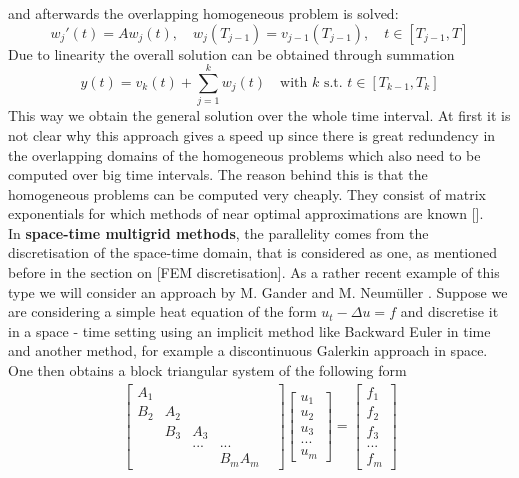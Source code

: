 \documentclass[../draft_1.tex]{subfiles}
\begin{document}
and afterwards the overlapping homogeneous problem is solved:
\begin{equation}
w_j'(t) = A w_j(t), \quad w_j(T_{j-1}) = v_{j-1}(T_{j-1}), \quad t \in [T_{j-1}, T]
\end{equation}
Due to linearity the overall solution can be obtained through summation
\begin{equation}
y(t) = v_k(t) + \sum_{j=1}^{k}w_j(t) \quad \text{with } k \text{ s.t. } t \in [T_{k-1}, T_k]
\end{equation}
This way we obtain the general solution over the whole time interval. At first it is not clear why this approach gives a speed up since there is great redundency in the overlapping domains of the homogeneous problems which also need to be computed over big time intervals. The reason behind this is that the homogeneous problems can be computed very cheaply. They consist of matrix exponentials for which methods of near optimal approximations are known [\cite{}]. 
\smallskip
\\
In \textbf{space-time multigrid methods}, the parallelity comes from the discretisation of the space-time domain, that is considered as one, as mentioned before in the section on [FEM discretisation]. As a rather recent example of this type we will consider an approach by M. Gander and M. Neum\"uller \cite{gander2016analysis}. Suppose we are considering a simple heat equation of the form $u_t - \Delta u = f $ and discretise it in a space - time setting using an implicit method like Backward Euler in time and another method, for example a discontinuous Galerkin approach in space. One then obtains a block triangular system of the following form
\begin{equation}
\begin{aligned}
\begin{bmatrix}
A_1 & & & & \\
B_2 & A_2 & & & \\
& B_3 & A_3 & & \\
& & ... & ... & \\
& & & B_m A_m 
\end{bmatrix}
\begin{bmatrix}
u_1 \\
u_2 \\
u_3 \\
... \\
u_m 
\end{bmatrix}
= \begin{bmatrix}
f_1 \\
f_2 \\
f_3 \\
... \\
f_m 
\end{bmatrix}
\end{aligned}
\end{equation}
\end{document}

